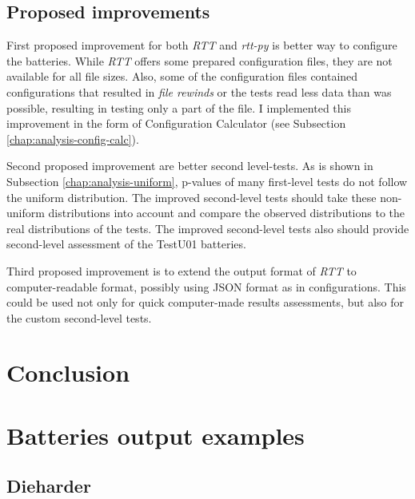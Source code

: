 \documentclass[
  digital,     %
  oneside,     %
  nosansbold,  %
  nocolorbold, %
  nolof,         %
  nolot,         %
]{fithesis4}
\begin{document}
\section{Proposed improvements}
First proposed improvement for both \emph{RTT} and \emph{rtt-py} is better way to configure the batteries. While \emph{RTT} offers some prepared configuration files, they are not available for all file sizes. Also, some of the configuration files contained configurations that resulted in \emph{file rewinds} or the tests read less data than was possible, resulting in testing only a part of the file. I implemented this improvement in the form of Configuration Calculator (see Subsection \ref{chap:analysis-config-calc}).

Second proposed improvement are better second level-tests. As is shown in Subsection \ref{chap:analysis-uniform}, p-values of many first-level tests do not follow the uniform distribution. The improved second-level tests should take these non-uniform distributions into account and compare the observed distributions to the real distributions of the tests. The improved second-level tests also should provide second-level assessment of the TestU01 batteries.

Third proposed improvement is to extend the output format of \emph{RTT} to computer-readable format, possibly using JSON format as in configurations. This could be used not only for quick computer-made results assessments, but also for the custom second-level tests.


\chapter{Conclusion}

\appendix 

\chapter{Batteries output examples} \label{append:dieharder-output}
\section{Dieharder}
\end{document}
